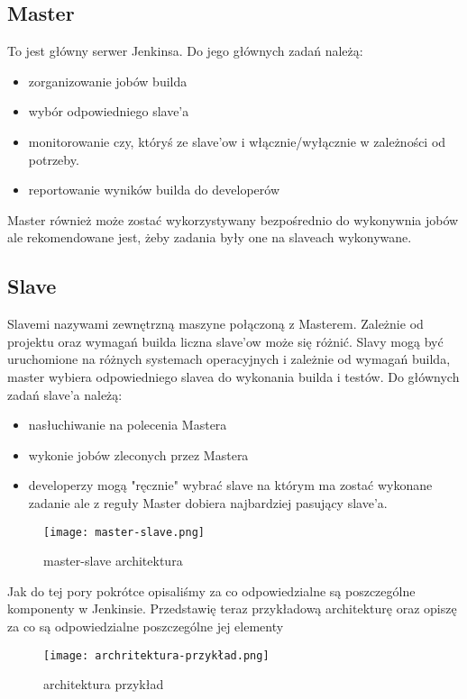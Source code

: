 \subsection{Master}

To jest główny serwer Jenkinsa. Do jego głównych zadań należą:
\begin{itemize}
    \item zorganizowanie jobów builda
    \item wybór odpowiedniego slave'a
    \item monitorowanie czy, któryś ze slave'ow i włącznie/wyłącznie w zależności od potrzeby.
    \item reportowanie wyników builda do developerów
\end{itemize}

Master również może zostać wykorzystywany bezpośrednio do wykonywnia jobów ale rekomendowane jest, żeby zadania były one na slaveach wykonywane.

\subsection{Slave}

Slavemi nazywami zewnętrzną maszyne połączoną z Masterem. Zależnie od projektu oraz wymagań builda liczna slave'ow może się różnić. Slavy mogą być uruchomione na różnych systemach operacyjnych i zależnie od wymagań builda, master wybiera odpowiedniego slavea do wykonania builda i testów. 
Do głównych zadań slave'a należą:
\begin{itemize}
    \item nasłuchiwanie na polecenia Mastera
    \item wykonie jobów zleconych przez Mastera
    \item developerzy mogą "ręcznie" wybrać slave na którym ma zostać wykonane zadanie ale z reguły Master dobiera najbardziej pasujący slave'a.
\end{itemize}

\begin{figure}[htbp]
    \centering
    \texttt{[image: master-slave.png]}
    \caption{master-slave architektura}
    \label{fig:master-slave}
\end{figure}

Jak do tej pory pokrótce opisaliśmy za co odpowiedzialne są poszczególne komponenty w Jenkinsie. Przedstawię teraz przykładową architekturę oraz opiszę za co są odpowiedzialne poszczególne jej elementy 

\begin{figure}[htbp]
    \centering
    \texttt{[image: archritektura-przykład.png]}
    \caption{architektura przykład}
    \label{fig:jenkins-architektura}
\end{figure}

